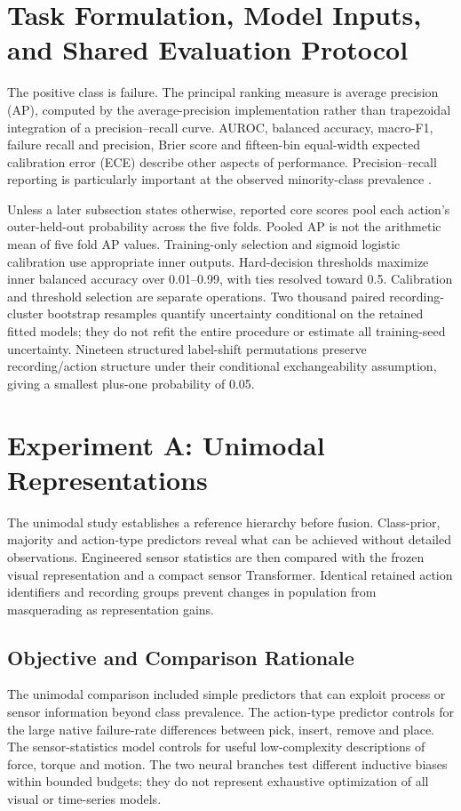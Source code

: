 \section{Task Formulation, Model Inputs, and Shared Evaluation Protocol}
The positive class is failure. The principal ranking measure is average precision (AP),
computed by the average-precision implementation rather than trapezoidal integration of
a precision--recall curve. AUROC, balanced accuracy, macro-F1, failure recall and
precision, Brier score and fifteen-bin equal-width expected calibration error (ECE)
describe other aspects of performance. Precision--recall reporting is particularly
important at the observed minority-class prevalence
\parencite{Saito2015PrecisionRecall}.

Unless a later subsection states otherwise, reported core scores pool each action's
outer-held-out probability across the five folds. Pooled AP is not the arithmetic mean
of five fold AP values. Training-only selection and sigmoid logistic calibration use
appropriate inner outputs. Hard-decision thresholds maximize inner balanced accuracy
over 0.01--0.99, with ties resolved toward 0.5. Calibration and threshold selection are
separate operations. Two thousand paired recording-cluster bootstrap resamples quantify
uncertainty conditional on the retained fitted models; they do not refit the entire
procedure or estimate all training-seed uncertainty. Nineteen structured label-shift
permutations preserve recording/action structure under their conditional exchangeability
assumption, giving a smallest plus-one probability of 0.05.

\section{Experiment A: Unimodal Representations}
The unimodal study establishes a reference hierarchy before fusion. Class-prior,
majority and action-type predictors reveal what can be achieved without detailed
observations. Engineered sensor statistics are then compared with the frozen visual
representation and a compact sensor Transformer. Identical retained action identifiers
and recording groups prevent changes in population from masquerading as representation
gains.

\subsection{Objective and Comparison Rationale}
The unimodal comparison included simple predictors that can exploit process or sensor
information beyond class prevalence. The action-type predictor controls for the large
native failure-rate differences between pick, insert, remove and place. The
sensor-statistics model controls for useful low-complexity descriptions of force, torque
and motion. The two neural branches test different inductive biases within bounded
budgets; they do not represent exhaustive optimization of all visual or time-series
models.

